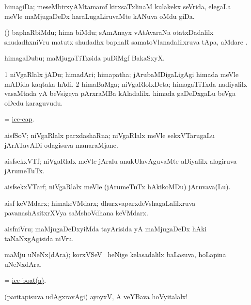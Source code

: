 \bentry
{}
\gl{\nA}
\bmng
himagiDa; meseMbirxyAMtamamf kirxsaTxlinaM kulakekx seVrida, elegaLa meVle maMjugaDeDx haraLugaLiruvaMte kANuva oMdu giDa. 
\emng
\eentry

\bentry
{}
\gl{\nA}
\bmng
(\Bwvi) baphaRbiMdu; hima biMdu; sAmAnayx vAtAvaraNa otatxDadalilx shudadhxniVru matutx shudadhx baphaR samatoVlanadalilxruva tApa, aMdare . 
\emng
\eentry

\bentry
{}
\gl{\nA}
\bmng
himagaDubu; maMjugaTiTxsida puDiMgf BakaSxyX. 
\emng
\eentry

\bentry
{}
\gl{\nA}
\bmng
\bnum
\num{1} niVgaRlalx jADu; himadAri; himapatha; jArubaMDigaLigAgi himada meVle mADida kaqtaka hAdi. 
\num{2} himaBaMga; niVgaRlolxDeta; himagaTiTxda nadiyalilx vasaMtada yA beVsigeya pArxraMBa kAladalilx, himada gaDeDxgaLu beVga oDedu karaguvudu. 
\enum
\emng
\eentry

\bentry
{}
\gl{\nA}
\bmng
 = \hyperlink{ice-cap}{ice-cap}. 
\emng
\eentry

\bentry
{}
\gl{\nA}
\bmng
aisfSoV; niVgaRlalx parxdashaRna; niVgaRlalx meVle sekxVTarugaLu jArATavADi odagisuva manaraMjane. 
\emng
\eentry

\bentry
{}
\gl{\nA}
\bmng
aisfsekxVTf; niVgaRlalx meVle jAralu anukUlavAguvaMte aDiyalilx alagiruva jArumeTuTx. 
\emng
\eentry

\bentry
{}
\gl{\nA}
\bmng
aisfsekxVTarf; niVgaRlalx meVle (jArumeTuTx hAkikoMDu) jAruvava(Lu). 
\emng
\eentry

\bentry
{}
\gl{\nA}
\bmng
aisf keVMdarx; himakeVMdarx; dhurxvaparxdeVshagaLalilxruva pavanashAsitxrXVya saMshoVdhana keVMdarx. 
\emng
\eentry

\bentry
{}
\gl{\nA}
\bmng
aisfniVru; maMjugaDeDxyiMda tayArisida yA maMjugaDeDx hAki taNaNxgAgisida niVru. 
\emng
\eentry

\bentry
{}
\gl{\nA}
\bmng
maMju uNeNx(dAra); korxVSeV \mo\ heNige kelasadalilx baLasuva, hoLapina uNeNxdAra. 
\emng
\eentry

\bentry
{}
\gl{\nA}
\bmng
 = \hyperlink{ice-boat}{ice-boat(a)}. 
\emng
\eentry

\bentry
{}
\gl{\nA}
\bmng
(paritapisuva udAgxravAgi) ayoyxV, A veYBava hoVyitalalx! 
\emng
\eentry

